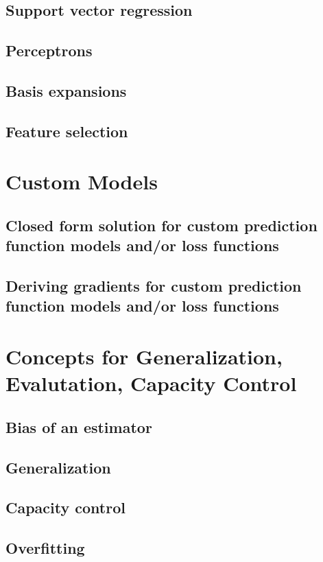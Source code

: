 \documentclass[11pt]{article}
\begin{document}
    \subsection{Support vector regression}
    \subsection{Perceptrons}
    \subsection{Basis expansions}
    \subsection{Feature selection}
    
    \section{Custom Models}
    
    \subsection{Closed form solution for custom prediction function models and/or loss functions}
    \subsection{Deriving gradients for custom prediction function models and/or loss functions}

    \section{Concepts for Generalization, Evalutation, Capacity Control}

    \subsection{Bias of an estimator}
    \subsection{Generalization}
    \subsection{Capacity control}
    \subsection{Overfitting}
\end{document}
